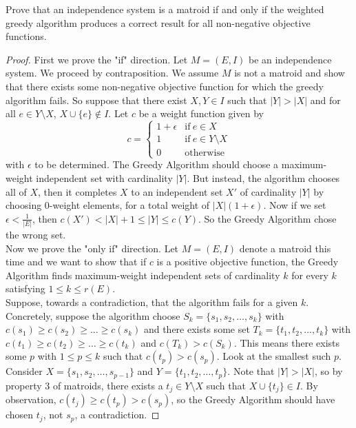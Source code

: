 \documentclass[12pt]{article}
\newenvironment{problem}[2][Problem]{\begin{trivlist}
\item[\hskip \labelsep {\bfseries #1}\hskip \labelsep {\bfseries #2.}]}{\end{trivlist}}
\theoremstyle{plain}
\begin{document}
\begin{problem}{9}
    Prove that an independence system is a matroid if and only if the weighted greedy algorithm produces a correct result for all non-negative objective functions.
\end{problem}
\begin{proof}
    First we prove the "if" direction. Let $M=(E,I)$ be an independence system. We proceed by contraposition. We assume $M$ is not a matroid and show that there exists some non-negative objective function for which the greedy algorithm fails. So suppose that there exist $X, Y\in I$ such that $|Y|>|X|$ and for all $e\in Y\setminus X$, $X\cup \{e\}\notin I$. Let $c$ be a weight function given by
    \[
        c =
        \begin{cases}
            1+\epsilon & \text{if}\ e\in X\\
            1 & \text{if}\ e\in Y\setminus X\\
            0 & \text{otherwise}
        \end{cases}
    \]
    with $\epsilon$ to be determined. The Greedy Algorithm should choose a maximum-weight independent set with cardinality $|Y|$. But instead, the algorithm chooses all of $X$, then it completes $X$ to an independent set $X'$ of cardinality $|Y|$ by choosing 0-weight elements, for a total weight of $|X|(1+\epsilon)$. Now if we set $\epsilon<\frac{1}{|E|}$, then $c(X') < |X| + 1 \leq |Y| \leq c(Y)$. So the Greedy Algorithm chose the wrong set.\\
    \indent Now we prove the "only if" direction. Let $M=(E,I)$ denote a matroid this time and we want to show that if $c$ is a positive objective function, the Greedy Algorithm finds maximum-weight independent sets of cardinality $k$ for every $k$ satisfying $1\leq k\leq r(E)$.\\
    \indent Suppose, towards a contradiction, that the algorithm fails for a given $k$. Concretely, suppose the algorithm choose $S_k = \{s_1, s_2, \ldots, s_k\}$ with $c(s_1)\geq c(s_2)\geq \ldots \geq c(s_k)$ and there exists some set $T_k = \{t_1, t_2, \ldots, t_k\}$ with $c(t_1)\geq c(t_2)\geq \ldots \geq c(t_k)$ and $c(T_k) > c(S_k)$. This means there exists some $p$ with $1\leq p\leq k$ such that $c(t_p) > c(s_p)$. Look at the smallest such $p$. Consider $X = \{s_1, s_2, \ldots, s_{p-1}\}$ and $Y = \{t_1, t_2,\ldots, t_p\}$. Note that $|Y|>|X|$, so by property 3 of matroids, there exists a $t_j\in Y\setminus X$ such that $X\cup\{t_j\}\in I$. By observation, $c(t_j)\geq c(t_p)>c(s_p)$, so the Greedy Algorithm should have chosen $t_j$, not $s_p$, a contradiction.
\end{proof}
\end{document}

